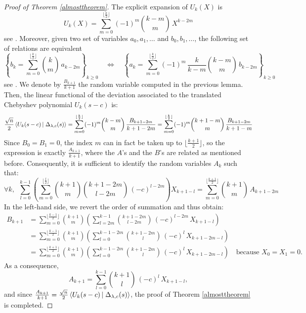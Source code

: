 \documentclass[10pt]{amsart}
\begin{document}
\begin{proof}[Proof of Theorem \ref{almosttheorem}]
The explicit expansion of $U_{k}(X)$ is
$$U_{k}(X)=\sum_{m=0}^{\lfloor \frac{k}{2}\rfloor} (-1)^{m}\binom{k-m}{m}\,X^{k-2m}$$
see \cite[p. 33]{IO02}. Moreover, given two set of variables $a_{0},a_{1},\ldots$ and $b_{0},b_{1},\ldots$, the following set of relations are equivalent
$$\left\{b_{k}=\sum_{m=0}^{\lfloor\frac{k}{2} \rfloor}\binom{k}{m} \,a_{k-2m}\right\}_{\!k \geq 0}\quad\iff\quad\left\{a_{k}=\sum_{m=0}^{\lfloor\frac{k}{2} \rfloor}(-1)^{m}\,\frac{k}{k-m}\binom{k-m}{m} \,b_{k-2m}\right\}_{\!k\geq 0}$$
see \cite[p. 36]{IO02}. We denote by $\frac{B_{k+1}}{k+1}$ the random variable computed in the previous lemma. Then, the linear functional of the deviation associated to the translated Chebyshev polynomial $U_{k}(s-c)$ is:
$$\frac{\sqrt{n}}{2}\scal{U_{k}(s-c)}{\Delta_{\lambda,c}(s)}=\sum_{m=0}^{\lfloor \frac{k}{2} \rfloor} (-1)^{m} \binom{k-m}{m}\,\frac{B_{k+1-2m}}{k+1-2m}=\sum_{m=0}^{\lfloor \frac{k}{2} \rfloor} (-1)^{m} \binom{k+1-m}{m}\,\frac{B_{k+1-2m}}{k+1-m}$$
Since $B_{0}=B_{1}=0$, the index $m$ can in fact be taken up to $\lfloor \frac{k+1}{2}\rfloor$, so the expression is exactly $\frac{A_{k+1}}{k+1}$, where the $A$'s and the $B$'s are related as mentioned before. Consequently, it is sufficient to identify the random variables $A_{k}$ such that:
$$\forall k,\,\,\,\sum_{l=0}^{k-1}\left(\sum_{m=0}^{\lfloor \frac{l}{2} \rfloor} \binom{k+1}{m}\binom{k+1-2m}{l-2m}\,(-c)^{l-2m}\right)X_{k+1-l}=\sum_{m=0}^{\lfloor \frac{k+1}{2}\rfloor} \binom{k+1}{m}\,A_{k+1-2m}$$
In the left-hand side, we revert the order of summation and thus obtain:
\begin{align*}B_{k+1}&=\sum_{m=0}^{\lfloor \frac{k-1}{2}\rfloor}\binom{k+1}{m}\left(\sum_{l=2m}^{k-1}\binom{k+1-2m}{l-2m}\,(-c)^{l-2m}\,X_{k+1-l}\right)\\ 
&=\sum_{m=0}^{\lfloor \frac{k-1}{2}\rfloor}\binom{k+1}{m}\left(\sum_{l=0}^{k-1-2m}\binom{k+1-2m}{l}\,(-c)^{l}\,X_{k+1-2m-l}\right)\\
&=\sum_{m=0}^{\lfloor \frac{k+1}{2}\rfloor}\binom{k+1}{m}\left(\sum_{l=0}^{k-1-2m}\binom{k+1-2m}{l}\,(-c)^{l}\,X_{k+1-2m-l}\right)\quad\text{because }X_{0}=X_{1}=0.
\end{align*}
As a consequence,
$$A_{k+1}=\sum_{l=0}^{k-1}\binom{k+1}{l}\,(-c)^{l}\,X_{k+1-l},$$
and since $\frac{A_{k+1}}{k+1}=\frac{\sqrt{n}}{2}\scal{U_{k}(s-c)}{\Delta_{\lambda,c}(s)}$,  the proof of Theorem \ref{almosttheorem} is completed.
\end{proof}
\bigskip
\bigskip
\end{document}

